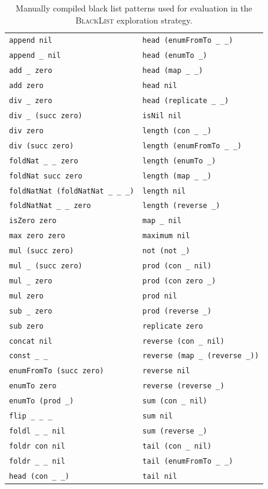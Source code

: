 \begin{longtable}{@{} l l@{}}
\caption{Manually compiled black list patterns used for evaluation in the \textsc{BlackList} exploration strategy.\label{fig:manual_blacklist}}\\
\toprule
\lstinline?append nil? & \lstinline?head (enumFromTo _ _)?\\
\lstinline?append _ nil? & \lstinline?head (enumTo _)?\\
\lstinline?add _ zero? & \lstinline?head (map _ _)?\\
\lstinline?add zero? & \lstinline?head nil?\\
\lstinline?div _ zero? & \lstinline?head (replicate _ _)?\\
\lstinline?div _ (succ zero)? & \lstinline?isNil nil?\\
\lstinline?div zero? & \lstinline?length (con _ _)?\\
\lstinline?div (succ zero)? & \lstinline?length (enumFromTo _ _)?\\
\lstinline?foldNat _ _ zero? & \lstinline?length (enumTo _)?\\
\lstinline?foldNat succ zero? & \lstinline?length (map _ _)?\\
\lstinline?foldNatNat (foldNatNat _ _ _)? & \lstinline?length nil?\\
\lstinline?foldNatNat _ _ zero? & \lstinline?length (reverse _)?\\
\lstinline?isZero zero? & \lstinline?map _ nil?\\
\lstinline?max zero zero? & \lstinline?maximum nil?\\
\lstinline?mul (succ zero)? & \lstinline?not (not _)?\\
\lstinline?mul _ (succ zero)? & \lstinline?prod (con _ nil)?\\
\lstinline?mul _ zero? & \lstinline?prod (con zero _)?\\
\lstinline?mul zero? & \lstinline?prod nil?\\
\lstinline?sub _ zero? & \lstinline?prod (reverse _)?\\
\lstinline?sub zero? & \lstinline?replicate zero?\\
\lstinline?concat nil? & \lstinline?reverse (con _ nil)?\\
\lstinline?const _ _? & \lstinline?reverse (map _ (reverse _))?\\
\lstinline?enumFromTo (succ zero)? & \lstinline?reverse nil?\\
\lstinline?enumTo zero? & \lstinline?reverse (reverse _)?\\
\lstinline?enumTo (prod _)? & \lstinline?sum (con _ nil)?\\
\lstinline?flip _ _ _? & \lstinline?sum nil?\\
\lstinline?foldl _ _ nil? & \lstinline?sum (reverse _)?\\
\lstinline?foldr con nil? & \lstinline?tail (con _ nil)?\\
\lstinline?foldr _ _ nil? & \lstinline?tail (enumFromTo _ _)?\\
\lstinline?head (con _ _)? & \lstinline?tail nil?\\
\bottomrule
\end{longtable}


